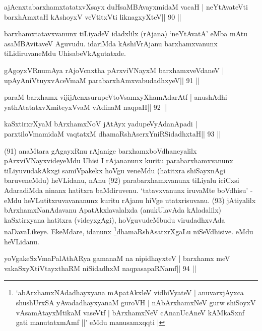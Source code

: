 
\begin{shl}
ajAcnxtabarxhamxtatatxvXsayx duHsaMBAvayxmidaM vacaH |
neYtAvateVti barxhAmxtaH kAshoyxV veVtitxVti liknagxyXteV\hfill || 90 ||
\end{shl}

\begin{artha}
barxhamxtatavxvanunx tiLiyadeV idadxlilx (rAjana) `neYtAvatA' eMba mAtu  asaMBAvitaveV Aguvudu. idariMda kAshiVrAjanu barxhamxvanunx tiLidiruvaneMdu UhisabeVkAgutatxde.
\end{artha}

\begin{shl}
gAgoyxVR\s numAya rAjoVcnx\s tha pArxviVNayxM barxhamxveVdaneV |
upAyAniVtuyxvAceVmaM parabarxhAmxvabudadhxyeV\hfill || 91 ||
\end{shl}

\begin{shl}
paraM barxhamx vijijAcnxsurupeVtoV\s samxyXhamAdarAtf |
anushAdhi yathAtatatxvXmiteyxVvaM vAdinaM naqpaH\hfill || 92 ||
\end{shl}

\begin{shl}
kaSxtirxrXyaM bArxhamxNoV jAtAyx yadupeVyAdanApadi |
parxtiloVmamidaM vaqtatxM dhamaRshAserxYniRSidadhxtaH\hfill || 93 ||
\end{shl}

\begin{artha}
(91) anaMtara gAgayxRnu rAjanige barxhamxboVdhaneyalilx pArxviVNayxvideyeMdu Uhisi I rAjananunx kuritu parabarxhamxvanunx tiLiyuvudakAkxgi samiVpakekx hoVgu veneMdu (hatitxra shiSayxnAgi baruveneMdu) heVLidanu, nAnu (92) parabarxhamxvanunx tiLiyalu iciCxsi AdaradiMda ninanx hatitxra baMdiruvenu. `tatavxvanunx iruvaMte boVdhisu' - eMdu heVLutitxruvavananunx kuritu rAjanu hiVge utatxrisuvanu. (93) jAtiyalilx bArxhamxNanAdavanu ApatAkxlavalalxda (anukUlavAda kAladalilx) kaSxtirxyana hatitxra (videyxgAgi), hoVguvudeMbudu virudadhxvAda naDavaLikeye. EkeMdare, idanunx \footnote[10]{`abArxhamxNAdadhayxyana mApatAkxleV vidhiVyateV | anuvarxjAyxca shushUrxSA yAvadadhayxyanaM guroVH | nAbArxhamxNeV gurw shiSoyxV vAsamAtayxMtikaM vaseVtf | bArxhamxNeV cAnanUcAneV kAMkaSxnf gati manutatxmAmf ||' eMdu manusamxqqti |}dhamaRshAsatxrXgaLu niSeVdhisive. eMdu heVLidanu.
\end{artha} 

\begin{shl}
yoVgakeSxVmaPalAthARya gamanaM na nipidhayxteV |
barxhamx meV vakaSxyXtiVtayxthaRM niSidadhxM naqpasapaRNamf\hfill || 94 ||
\end{shl}

